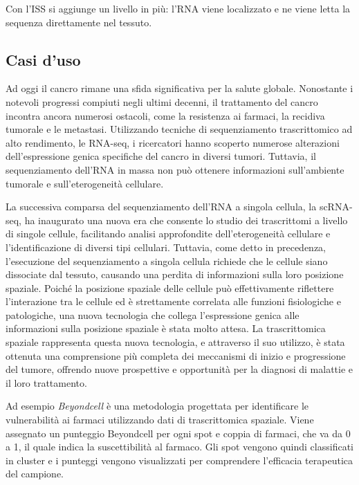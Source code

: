 Con l'ISS si aggiunge un livello in più: l'RNA viene localizzato e ne viene letta la sequenza direttamente nel tessuto.

\subsection{Casi d'uso}\label{subsec:datiEMetodi}
Ad oggi il cancro rimane una sfida significativa per la salute globale. 
Nonostante i notevoli progressi compiuti negli ultimi decenni, 
il trattamento del cancro incontra ancora numerosi ostacoli, 
come la resistenza ai farmaci, la recidiva tumorale e le metastasi.
Utilizzando tecniche di sequenziamento trascrittomico ad alto rendimento, le RNA-seq, 
i ricercatori hanno scoperto numerose alterazioni dell'espressione genica specifiche del cancro in diversi tumori. 
Tuttavia, il sequenziamento dell'RNA in massa non può ottenere informazioni sull'ambiente tumorale e sull'eterogeneità cellulare\cite{casiUsoTS1}.

La successiva comparsa del sequenziamento dell'RNA a singola cellula, la scRNA-seq, 
ha inaugurato una nuova era che consente lo studio dei trascrittomi a livello di singole cellule, 
facilitando analisi approfondite dell'eterogeneità cellulare e l'identificazione di diversi tipi cellulari. 
Tuttavia, come detto in precedenza, l'esecuzione del sequenziamento a singola cellula richiede che le cellule siano dissociate dal tessuto, 
causando una perdita di informazioni sulla loro posizione spaziale. 
Poiché la posizione spaziale delle cellule può effettivamente riflettere l'interazione 
tra le cellule ed è strettamente correlata alle funzioni fisiologiche e patologiche, 
una nuova tecnologia che collega l'espressione genica alle informazioni sulla posizione spaziale è stata molto attesa.
La trascrittomica spaziale rappresenta questa nuova tecnologia, 
e attraverso il suo utilizzo, 
è stata ottenuta una comprensione più completa dei meccanismi di inizio 
e progressione del tumore, offrendo nuove prospettive e opportunità per la diagnosi di malattie e il loro trattamento.

Ad esempio \textit{Beyondcell} è una metodologia progettata per identificare le vulnerabilità ai farmaci 
utilizzando dati di trascrittomica spaziale. 
Viene assegnato un punteggio Beyondcell per ogni spot e coppia di farmaci, 
che va da 0 a 1, il quale indica la suscettibilità al farmaco. 
Gli spot vengono quindi classificati in cluster e i punteggi vengono visualizzati 
per comprendere l'efficacia terapeutica del campione\cite{Beyondcell}.

